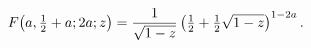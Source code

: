 \[\mathop{F\/}\nolimits\!\left(a,\tfrac{1}{2}+a;2a;z\right)=\frac{1}{\sqrt{1-z}}%
\left(\tfrac{1}{2}+\tfrac{1}{2}\sqrt{1-z}\right)^{1-2a}.\]